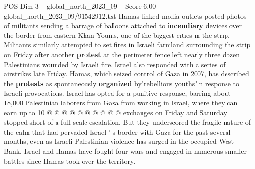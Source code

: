 \begin{textsample}{POS Dim 3 – global\_north\_2023\_09 – Score 6.00 – global\_north\_2023\_09/91542912.txt}
Hamas-linked media outlets posted photos of militants sending a barrage of balloons attached to \textbf{incendiary} devices over the border from eastern Khan Younis, one of the biggest cities in the strip.
Militants similarly attempted to set fires in Israeli farmland surrounding the strip on Friday after another \textbf{protest} at the perimeter fence left nearly three dozen Palestinians wounded by Israeli fire.
Israel also responded with a series of airstrikes late Friday.
Hamas, which seized control of Gaza in 2007, has described the \textbf{protests} as spontaneously \textbf{organized} by"rebellious youths"in response to Israeli provocations.
Israel has opted for a punitive response, barring about 18,000 Palestinian laborers from Gaza from working in Israel, where they can earn up to 10 @ @ @ @ @ @ @ @ @ @ exchanges on Friday and Saturday stopped short of a full-scale escalation.
But they underscored the fragile nature of the calm that had pervaded Israel ' s border with Gaza for the past several months, even as Israeli-Palestinian violence has surged in the occupied West Bank.
Israel and Hamas have fought four wars and engaged in numerous smaller battles since Hamas took over the territory.

\end{textsample}
